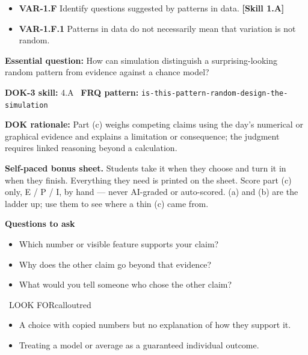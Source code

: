 \documentclass[11pt]{article}
\begin{document}


{\small
\begin{itemize}[leftmargin=1.5em,itemsep=2pt,topsep=2pt]
  \item \textbf{VAR-1.F} Identify questions suggested by patterns in data. \textbf{[Skill 1.A]}
  \item \textbf{VAR-1.F.1} Patterns in data do not necessarily mean that variation is not random.
\end{itemize}
}
\textbf{Essential question:} How can simulation distinguish a surprising-looking random pattern from evidence against a chance model?\par
\textbf{DOK-3 skill:} 4.A \textperiodcentered\ \textbf{FRQ pattern:} {\small\texttt{is-\allowbreak{}this-\allowbreak{}pattern-\allowbreak{}random-\allowbreak{}design-\allowbreak{}the-\allowbreak{}simulation}}\par
\textbf{DOK rationale:} Part (c) weighs competing claims using the day's numerical or graphical evidence and explains a limitation or consequence; the judgment requires linked reasoning beyond a calculation.\par

\textbf{Self-paced bonus sheet.} Students take it when they choose and turn it in when they finish. Everything they need is printed on the sheet. Score part (c) only, E / P / I, by hand --- never AI-graded or auto-scored. (a) and (b) are the ladder up; use them to see where a thin (c) came from.\par

\textbf{Questions to ask}
\begin{itemize}[leftmargin=1.5em,itemsep=2pt,topsep=2pt]
  \item Which number or visible feature supports your claim?
  \item Why does the other claim go beyond that evidence?
  \item What would you tell someone who chose the other claim?
\end{itemize}

\begin{callout}{\IconWarn\ LOOK FOR}{calloutred}
\begin{itemize}[leftmargin=1.5em,itemsep=2pt,topsep=2pt]
  \item A choice with copied numbers but no explanation of how they support it.
  \item Treating a model or average as a guaranteed individual outcome.
\end{itemize}
\end{callout}
\end{document}
